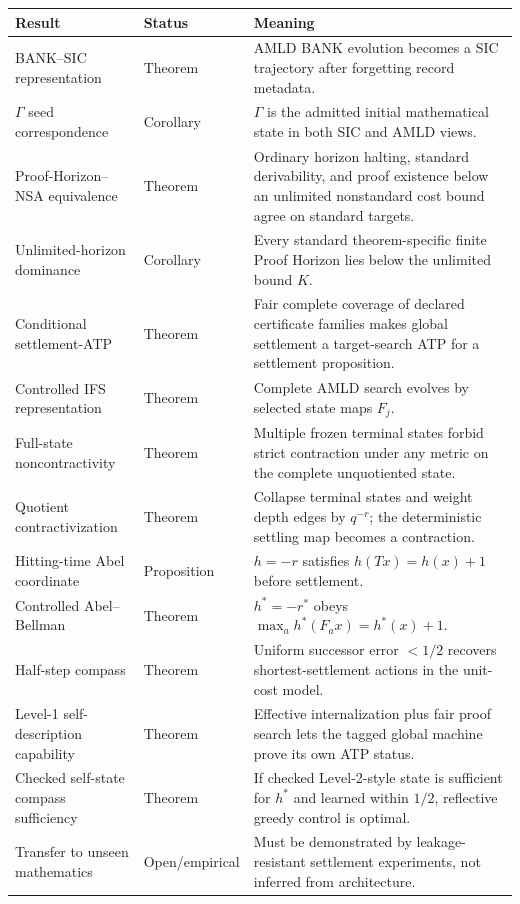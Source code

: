\documentclass[11pt]{article}
\theoremstyle{definition}
\theoremstyle{remark}
\begin{document}
\begin{center}
\begin{tabularx}{\textwidth}{>{\raggedright\arraybackslash}p{} >{\raggedright\arraybackslash}p{} X}
\toprule
\textbf{Result} & \textbf{Status} & \textbf{Meaning}\\
\midrule
BANK--SIC representation & Theorem & AMLD BANK evolution becomes a SIC trajectory after forgetting record metadata.\\
$\Gamma$ seed correspondence & Corollary & $\Gamma$ is the admitted initial mathematical state in both SIC and AMLD views.\\
Proof-Horizon--NSA equivalence & Theorem & Ordinary horizon halting, standard derivability, and proof existence below an unlimited nonstandard cost bound agree on standard targets.\\
Unlimited-horizon dominance & Corollary & Every standard theorem-specific finite Proof Horizon lies below the unlimited bound $K$.\\
Conditional settlement-ATP & Theorem & Fair complete coverage of declared certificate families makes global settlement a target-search ATP for a settlement proposition.\\
Controlled IFS representation & Theorem & Complete AMLD search evolves by selected state maps $F_j$.\\
Full-state noncontractivity & Theorem & Multiple frozen terminal states forbid strict contraction under any metric on the complete unquotiented state.\\
Quotient contractivization & Theorem & Collapse terminal states and weight depth edges by $q^{-r}$; the deterministic settling map becomes a contraction.\\
Hitting-time Abel coordinate & Proposition & $h=-r$ satisfies $h(Tx)=h(x)+1$ before settlement.\\
Controlled Abel--Bellman & Theorem & $h^*=-r^*$ obeys $\max_a h^*(F_a x)=h^*(x)+1$.\\
Half-step compass & Theorem & Uniform successor error $<1/2$ recovers shortest-settlement actions in the unit-cost model.\\
Level-1 self-description capability & Theorem & Effective internalization plus fair proof search lets the tagged global machine prove its own ATP status.\\
Checked self-state compass sufficiency & Theorem & If checked Level-2-style state is sufficient for $h^*$ and learned within $1/2$, reflective greedy control is optimal.\\
Transfer to unseen mathematics & Open/empirical & Must be demonstrated by leakage-resistant settlement experiments, not inferred from architecture.\\
\bottomrule
\end{tabularx}
\end{center}
\end{document}
